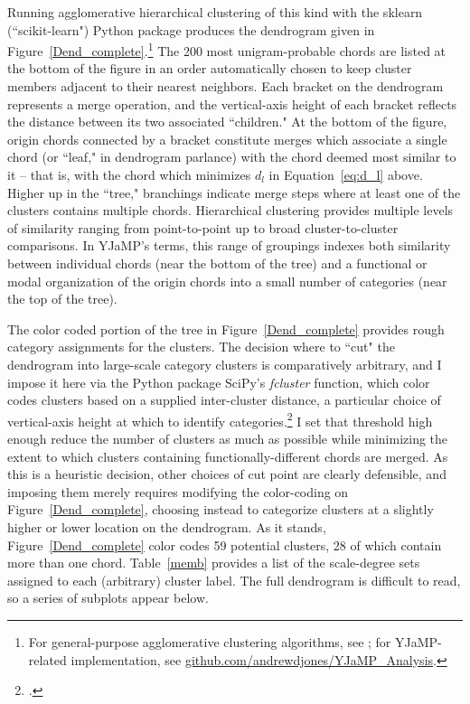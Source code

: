 Running agglomerative hierarchical clustering of this kind with the sklearn (``scikit-learn") Python package produces the dendrogram given in Figure~\ref{Dend_complete}.\footnote{For general-purpose agglomerative clustering algorithms, see \cite{scikit-learn}; for YJaMP-related implementation, see \href{github.com/andrewdjones/YJaMP_Analysis}{github.com/andrewdjones/YJaMP\_Analysis}.}  The 200 most unigram-probable chords are listed at the bottom of the figure in an order automatically chosen to keep cluster members adjacent to their nearest neighbors.  Each bracket on the dendrogram represents a merge operation, and the vertical-axis height of each bracket reflects the distance between its two associated ``children."  At the bottom of the figure, origin chords connected by a bracket constitute merges which associate a single chord (or ``leaf," in dendrogram parlance) with the chord deemed most similar to it -- that is, with the chord which minimizes $d_l$ in Equation~\ref{eq:d_l} above.  Higher up in the ``tree," branchings indicate merge steps where at least one of the clusters contains multiple chords.  Hierarchical clustering provides multiple levels of similarity ranging from point-to-point up to broad cluster-to-cluster comparisons.  In YJaMP's terms, this range of groupings indexes both similarity between individual chords (near the bottom of the tree) and a functional or modal organization of the origin chords into a small number of categories (near the top of the tree).

The color coded portion of the tree in Figure~\ref{Dend_complete} provides rough category assignments for the clusters.  The decision where to ``cut" the dendrogram into large-scale category clusters is comparatively arbitrary, and I impose it here via the Python package SciPy's \emph{fcluster} function, which color codes clusters based on a supplied inter-cluster distance, a particular choice of vertical-axis height at which to identify categories.\footnote{\cite{scipy}.}  I set that threshold high enough reduce the number of clusters as much as possible while minimizing the extent to which clusters containing functionally-different chords are merged.  As this is a heuristic decision, other choices of cut point are clearly defensible, and imposing them merely requires modifying the color-coding on Figure~\ref{Dend_complete}, choosing instead to categorize clusters at a slightly higher or lower location on the dendrogram.  As it stands, Figure~\ref{Dend_complete} color codes 59 potential clusters, 28 of which contain more than one chord.  Table~\ref{memb} provides a list of the scale-degree sets assigned to each (arbitrary) cluster label.  The full dendrogram is difficult to read, so a series of subplots appear below.

